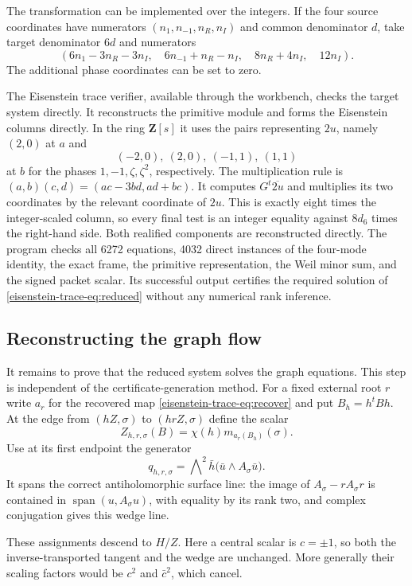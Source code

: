 \documentclass[11pt]{article}
\theoremstyle{definition}
\theoremstyle{remark}
\newcommand{\Z}{\mathbf Z}
\begin{document}
The transformation can be implemented over the integers.  If the four
source coordinates have numerators $(n_1,n_{-1},n_R,n_I)$ and common
denominator $d$, take target denominator $6d$ and numerators
\[
 (6n_1-3n_R-3n_I,\quad6n_{-1}+n_R-n_I,\quad
   8n_R+4n_I,\quad12n_I).
\]
The additional phase coordinates can be set to zero.

The Eisenstein trace verifier, available through the workbench, checks
the target system directly.  It reconstructs the primitive module and forms the
Eisenstein columns directly.  In the ring $\Z[s]$ it uses the pairs
representing $2u$, namely $(2,0)$ at $a$ and
\[
 (-2,0),\ (2,0),\ (-1,1),\ (1,1)
\]
at $b$ for the phases $1,-1,\zeta,\zeta^2$, respectively.
The multiplication rule is
$(a,b)(c,d)=(ac-3bd,ad+bc)$.
It computes $G^t\overline{2u}$ and multiplies its two coordinates
by the relevant coordinate of $2u$.  This is exactly eight times
the integer-scaled column, so every final test is an integer equality
against $8d_6$ times the right-hand side.  Both realified components
are reconstructed directly.  The program checks all 6272 equations,
4032 direct instances of the four-mode identity, the exact frame,
the primitive representation, the Weil minor sum, and the signed
packet scalar.  Its successful output certifies the required solution
of \eqref{eisenstein-trace-eq:reduced} without any numerical rank inference.

\subsection{Reconstructing the graph flow}

It remains to prove that the reduced system solves the graph equations.
This step is independent of the certificate-generation method.
For a fixed external root $r$ write $a_r$ for the recovered map
\eqref{eisenstein-trace-eq:recover} and put $B_h=h^tBh$.  At the edge from
$(hZ,\sigma)$ to $(hrZ,\sigma)$ define the scalar
\begin{equation}\label{eisenstein-trace-eq:potential}
 Z_{h,r,\sigma}(B)=\chi(h)m_{a_r(B_h)}(\sigma).
\end{equation}
Use at its first endpoint the generator
\[
 q_{h,r,\sigma}
 =\bigwedge\nolimits^2\bar h\bigl(\bar u\wedge A_\sigma\bar u\bigr).
\]
It spans the correct antiholomorphic surface line: the image of
$A_\sigma-rA_\sigma r$ is contained in
$\operatorname{span}(u,A_\sigma u)$, with equality by its rank two,
and complex conjugation gives this wedge line.

These assignments descend to $H/Z$.  Here a central scalar is
$c=\pm1$, so both the inverse-transported tangent and the wedge are
unchanged.  More generally their scaling factors would be $c^2$
and $\bar c^2$, which cancel.
\end{document}
